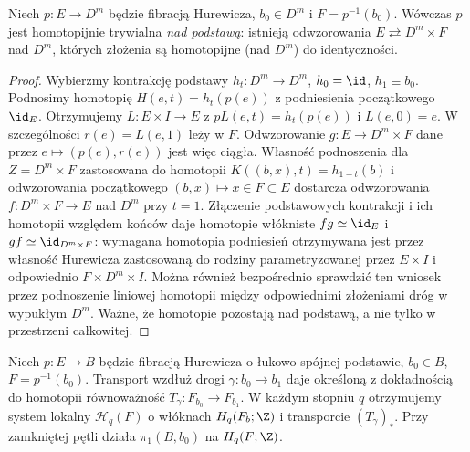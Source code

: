 \begin{lemat}
\label{lem:serre-disk-v5}
Niech $p:E\to D^m$ będzie fibracją Hurewicza, $b_0\in D^m$
i $F=p^{-1}(b_0)$. Wówczas $p$ jest homotopijnie
trywialna \emph{nad podstawą}: istnieją odwzorowania
$E\rightleftarrows D^m\times F$ nad $D^m$,
których złożenia są homotopijne (nad $D^m$) do identyczności.
\end{lemat}
\begin{proof}
Wybierzmy kontrakcję podstawy $h_t:D^m\to D^m$,
$h_0=\id$, $h_1\equiv b_0$. Podnosimy homotopię
$H(e,t)=h_t(p(e))$ z podniesienia początkowego $\id_E$.
Otrzymujemy $L:E\times I\to E$ z $pL(e,t)=h_t(p(e))$
i $L(e,0)=e$. W szczególności $r(e)=L(e,1)$ leży w $F$.
Odwzorowanie $g:E\to D^m\times F$ dane przez $e\mapsto(p(e),r(e))$
jest więc ciągła. Własność podnoszenia dla
$Z=D^m\times F$ zastosowana do homotopii
$K((b,x),t)=h_{1-t}(b)$ i odwzorowania początkowego
$(b,x)\mapsto x\in F\subset E$ dostarcza odwzorowania
$f:D^m\times F\to E$ nad $D^m$ przy $t=1$.
Złączenie podstawowych kontrakcji i ich homotopii
względem końców daje homotopie włókniste
$fg\simeq\id_E$ i $gf\simeq\id_{D^m\times F}$:
wymagana homotopia podniesień otrzymywana jest przez
własność Hurewicza zastosowaną do rodziny parametryzowanej
przez $E\times I$ i odpowiednio $F\times D^m\times I$.
Można również bezpośrednio sprawdzić ten wniosek przez
podnoszenie liniowej homotopii między odpowiednimi
złożeniami dróg w wypukłym $D^m$. Ważne, że homotopie
pozostają nad podstawą, a nie tylko w przestrzeni całkowitej.
\end{proof}

\begin{definicja}
Niech $p:E\to B$ będzie fibracją Hurewicza o łukowo spójnej
podstawie, $b_0\in B$, $F=p^{-1}(b_0)$.
Transport wzdłuż drogi $\gamma:b_0\to b_1$ daje określoną
z dokładnością do homotopii równoważność
$T_\gamma:F_{b_0}\to F_{b_1}$.
W każdym stopniu $q$ otrzymujemy system lokalny
$\mathcal H_q(F)$ o włóknach $H_q(F_b;\Z)$ i transporcie
$(T_\gamma)_*$. Przy zamkniętej pętli działa
$\pi_1(B,b_0)$ na $H_q(F;\Z)$.
\end{definicja}

